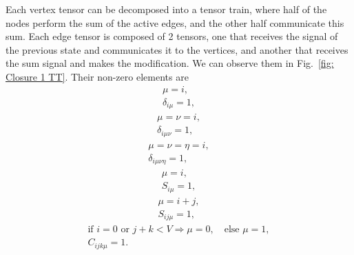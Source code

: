 Each vertex tensor can be decomposed into a tensor train, where half of the nodes perform the sum of the active edges, and the other half communicate this sum. Each edge tensor is composed of 2 tensors, one that receives the signal of the previous state and communicates it to the vertices, and another that receives the sum signal and makes the modification. We can observe them in Fig.~\ref{fig: Closure 1 TT}. Their non-zero elements are
\begin{equation}
    \begin{gathered}
    \mu = i,\\
    \delta_{i\mu} = 1,
    \end{gathered}
\end{equation}
\begin{equation}
    \begin{gathered}
    \mu =\nu = i,\\
    \delta_{i\mu\nu} = 1,
    \end{gathered}
\end{equation}
\begin{equation}
    \begin{gathered}
    \mu =\nu =\eta= i,\\
    \delta_{i\mu\nu\eta} = 1,
    \end{gathered}
\end{equation}
\begin{equation}
    \begin{gathered}
    \mu = i,\\
    S_{i\mu} = 1,
    \end{gathered}
\end{equation}
\begin{equation}
    \begin{gathered}
    \mu = i+j,\\
    S_{ij\mu} = 1,
    \end{gathered}
\end{equation}
\begin{equation}
    \begin{gathered}
    \text{if } i=0 \text{ or } j+k<V \Rightarrow \mu = 0, \quad\text{else } \mu = 1,\\
    C_{ijk\mu} = 1.
    \end{gathered}
\end{equation}

